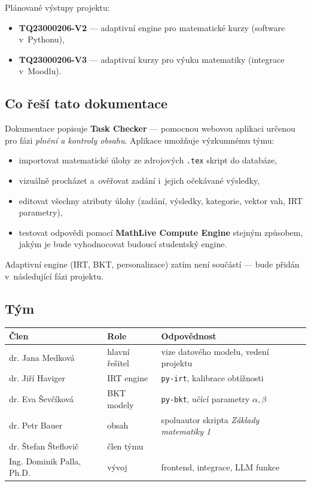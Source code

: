 \documentclass[11pt,a4paper]{article}
\begin{document}
Plánované výstupy projektu:
\begin{itemize}
  \item \textbf{TQ23000206-V2} --- adaptivní engine pro matematické kurzy (software v~Pythonu),
  \item \textbf{TQ23000206-V3} --- adaptivní kurzy pro výuku matematiky (integrace v~Moodlu).
\end{itemize}

\subsection{Co řeší tato dokumentace}

Dokumentace popisuje \textbf{Task Checker} --- pomocnou webovou aplikaci určenou pro fázi \emph{plnění a kontroly obsahu}. Aplikace umožňuje výzkumnému týmu:

\begin{itemize}
  \item importovat matematické úlohy ze zdrojových \texttt{.tex} skript do databáze,
  \item vizuálně procházet a~ověřovat zadání i~jejich očekávané výsledky,
  \item editovat všechny atributy úlohy (zadání, výsledky, kategorie, vektor vah, IRT parametry),
  \item testovat odpovědi pomocí \textbf{MathLive Compute Engine} stejným způsobem, jakým je bude vyhodnocovat budoucí studentský engine.
\end{itemize}

Adaptivní engine (IRT, BKT, personalizace) zatím není součástí --- bude přidán v~následující fázi projektu.

\subsection{Tým}

\begin{tabular}{lll}
  \toprule
  \textbf{Člen} & \textbf{Role} & \textbf{Odpovědnost} \\
  \midrule
  dr. Jana Medková      & hlavní řešitel       & vize datového modelu, vedení projektu \\
  dr. Jiří Haviger      & IRT engine           & \texttt{py-irt}, kalibrace obtížnosti \\
  dr. Eva Ševčíková     & BKT modely           & \texttt{py-bkt}, učící parametry $\alpha, \beta$ \\
  dr. Petr Bauer        & obsah                & spoluautor skripta \emph{Základy matematiky 1} \\
  dr. Štefan Šteflovič  & člen týmu            & \\
  Ing. Dominik Palla, Ph.D. & vývoj            & frontend, integrace, LLM funkce \\
  \bottomrule
\end{tabular}
\end{document}
